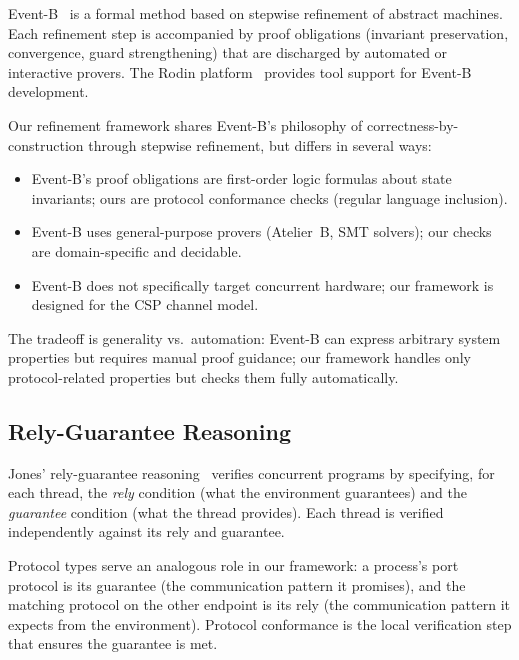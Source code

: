 \documentclass[11pt]{article}
\begin{document}
Event-B~\cite{abrial2010} is a formal method based on stepwise
refinement of abstract machines.  Each refinement step is accompanied
by proof obligations (invariant preservation, convergence, guard
strengthening) that are discharged by automated or interactive
provers.  The Rodin platform~\cite{rodin} provides tool support for
Event-B development.

Our refinement framework shares Event-B's philosophy of
correctness-by-construction through stepwise refinement, but differs
in several ways:
\begin{itemize}
\item Event-B's proof obligations are first-order logic formulas
  about state invariants; ours are protocol conformance checks
  (regular language inclusion).
\item Event-B uses general-purpose provers (Atelier~B, SMT solvers);
  our checks are domain-specific and decidable.
\item Event-B does not specifically target concurrent hardware;
  our framework is designed for the CSP channel model.
\end{itemize}

The tradeoff is generality vs.\ automation: Event-B can express
arbitrary system properties but requires manual proof guidance; our
framework handles only protocol-related properties but checks them
fully automatically.

\subsection{Rely-Guarantee Reasoning}

Jones' rely-guarantee reasoning~\cite{jones1983} verifies concurrent
programs by specifying, for each thread, the \emph{rely} condition
(what the environment guarantees) and the \emph{guarantee} condition
(what the thread provides).  Each thread is verified independently
against its rely and guarantee.

Protocol types serve an analogous role in our framework: a process's
port protocol is its guarantee (the communication pattern it promises),
and the matching protocol on the other endpoint is its rely (the
communication pattern it expects from the environment).  Protocol
conformance is the local verification step that ensures the guarantee
is met.

\end{document}
